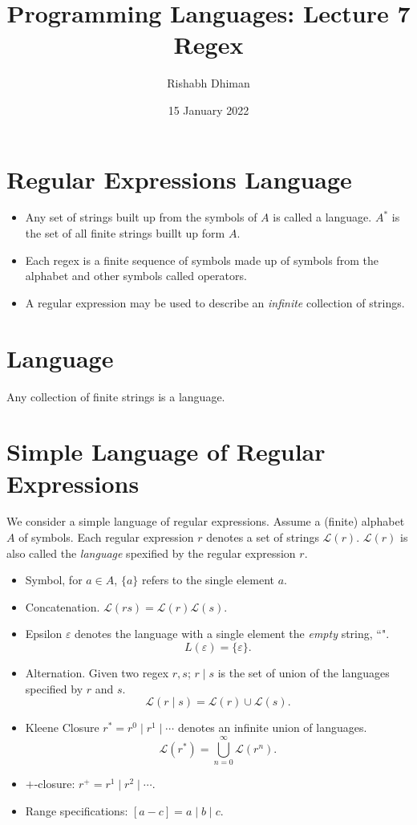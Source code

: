 \documentclass[a4paper]{scrartcl}
\title{
	Programming Languages: Lecture 7\\
	Regex
}
\author{Rishabh Dhiman}
\date{15 January 2022}
\theoremstyle{definition}
\newcommand{\eps}{\varepsilon}
\begin{document}
\maketitle

\section{Regular Expressions Language}
\begin{itemize}
	\item Any set of strings built up from the symbols of $A$ is called a language. $A^*$ is the set of all finite strings buillt up form $A$.
	\item Each regex is a finite sequence of symbols made up of symbols from the alphabet and other symbols called operators.
	\item A regular expression may be used to describe an \emph{infinite} collection of strings.
\end{itemize}

\section{Language}
Any collection of finite strings is a language.

\section{Simple Language of Regular Expressions}
We consider a simple language of regular expressions. Assume a (finite) alphabet $A$ of symbols. Each regular expression $r$ denotes a set of strings $\mathcal L(r)$. $\mathcal L(r)$ is also called the \emph{language} spexified by the regular expression $r$.
\begin{itemize}
	\item Symbol, for $a \in A$, $\{a\}$ refers to the single element $a$.
	\item Concatenation. $\mathcal{L}(rs) = \mathcal{L}(r)\mathcal{L}(s)$.
	\item Epsilon $\eps$ denotes the language with a single element the \emph{empty} string, ``\;".
		\[L(\eps) = \{\eps\}.\]
	\item Alternation. Given two regex $r, s$; $r \mid s$ is the set of union of the languages specified by $r$ and $s$.
		\[\mathcal{L}(r \mid s) = \mathcal{L}(r) \cup \mathcal{L}(s).\]
	\item Kleene Closure $r^* = r^0 \mid r^1 \mid \cdots$ denotes an infinite union of languages.
		\[\mathcal{L}(r^*) = \bigcup_{n = 0}^{\infty} \mathcal{L}(r^n).\]
	\item $+$-closure: $r^+ = r^1 \mid r^2 \mid \cdots$.
	\item Range specifications: $[a - c] = a \mid b \mid c$.
\end{itemize}
\end{document}
